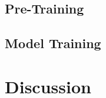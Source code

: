 \documentclass{article}
\begin{document}
        \subsection{Pre-Training}

        \subsection{Model Training}

	\section{Discussion}
\end{document}

